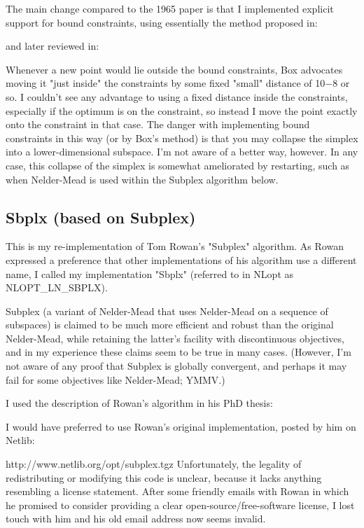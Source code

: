 The main change compared to the 1965 paper is that I implemented explicit support for bound constraints, using essentially the method proposed in: \cite{Box_1965} 


and later reviewed in: \cite{Richardson_1973}


Whenever a new point would lie outside the bound constraints, Box advocates moving it "just inside" the constraints by some fixed "small" distance of 10−8 or so. I couldn't see any advantage to using a fixed distance inside the constraints, especially if the optimum is on the constraint, so instead I move the point exactly onto the constraint in that case. The danger with implementing bound constraints in this way (or by Box's method) is that you may collapse the simplex into a lower-dimensional subspace. I'm not aware of a better way, however. In any case, this collapse of the simplex is somewhat ameliorated by restarting, such as when Nelder-Mead is used within the Subplex algorithm below. 





\subsection{Sbplx (based on Subplex)}
This is my re-implementation of Tom Rowan's "Subplex" algorithm. As Rowan expressed a preference that other implementations of his algorithm use a different name, I called my implementation "Sbplx" (referred to in NLopt as NLOPT\_LN\_SBPLX). 

Subplex (a variant of Nelder-Mead that uses Nelder-Mead on a sequence of subspaces) is claimed to be much more efficient and robust than the original Nelder-Mead, while retaining the latter's facility with discontinuous objectives, and in my experience these claims seem to be true in many cases. (However, I'm not aware of any proof that Subplex is globally convergent, and perhaps it may fail for some objectives like Nelder-Mead; YMMV.) 

I used the description of Rowan's algorithm in his PhD thesis: \cite{Rowan_1990}

I would have preferred to use Rowan's original implementation, posted by him on Netlib: 

http://www.netlib.org/opt/subplex.tgz 
Unfortunately, the legality of redistributing or modifying this code is unclear, because it lacks anything resembling a license statement. After some friendly emails with Rowan in which he promised to consider providing a clear open-source/free-software license, I lost touch with him and his old email address now seems invalid. 

